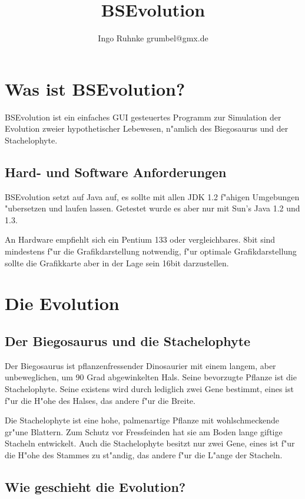 \documentclass[a4paper]{article}
\title{BSEvolution}
\author{Ingo Ruhnke grumbel@gmx.de}
\begin{document}
\maketitle

\tableofcontents

\section{Was ist BSEvolution?}

BSEvolution ist ein einfaches GUI gesteuertes Programm zur Simulation
der Evolution zweier hypothetischer Lebewesen, n"amlich des
Biegosaurus und der Stachelophyte.

\subsection{Hard- und Software Anforderungen}
BSEvolution setzt auf Java auf, es sollte mit allen JDK 1.2 f"ahigen
Umgebungen "ubersetzen und laufen lassen. Getestet wurde es aber nur
mit Sun's Java 1.2 und 1.3.

An Hardware empfiehlt sich ein Pentium 133 oder vergleichbares. 8bit
sind mindestens f"ur die Grafikdarstellung notwendig, f"ur optimale
Grafikdarstellung sollte die Grafikkarte aber in der Lage sein 16bit
darzustellen.

\section{Die Evolution}
\subsection{Der Biegosaurus und die Stachelophyte}

Der Biegosaurus ist pflanzenfressender Dinosaurier mit einem langem,
aber unbeweglichen, um 90 Grad abgewinkelten Hals.  Seine bevorzugte
Pflanze ist die Stachelophyte. Seine existens wird durch lediglich
zwei Gene bestimmt, eines ist f"ur die H"ohe des Halses, das andere
f"ur die Breite.
 
Die Stachelophyte ist eine hohe, palmenartige Pflanze mit
wohlschmeckende gr"une Blattern.  Zum Schutz vor Fressfeinden hat sie
am Boden lange giftige Stacheln entwickelt. Auch die Stachelophyte
besitzt nur zwei Gene, eines ist f"ur die H"ohe des Stammes zu
st"andig, das andere f"ur die L"ange der Stacheln.


\subsection{Wie geschieht die Evolution?}
\end{document}
